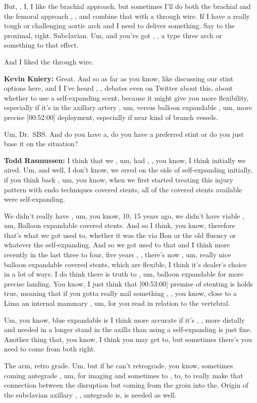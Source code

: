 \documentclass[
]{book}
\begin{document}
But, , I, I like the brachial approach, but sometimes I'll do both the
brachial and the femoral approach , , and combine that with a through
wire. If I have a really tough or challenging aortic arch and I need to
deliver something. Say to the proximal, right. Subclavian. Um, and
you've got , , a type three arch or something to that effect.

And I liked the through wire.

\textbf{Kevin Kniery:} Great. And so as far as you know, like discussing our
stint options here, and I I've heard , , debates even on Twitter about
this, about whether to use a self-expanding scent, because it might give
you more flexibility, especially if it's in the axillary artery , um,
versus balloon expandable , um, more precise {[}00:52:00{]} deployment,
especially if near kind of branch vessels.

Um, Dr.~SBS. And do you have a, do you have a preferred stint or do you
just base it on the situation?

\textbf{Todd Rasmussen:} I think that we , um, had , , you know, I think
initially we aired. Um, and well, I don't know, we erred on the side of
self-expanding initially, if you think back , um, you know, when we
first started treating this injury pattern with endo techniques covered
stents, all of the covered stents available were self-expanding.

We didn't really have , um, you know, 10, 15 years ago, we didn't have
viable , um, Balloon expandable covered stents. And so I think, you
know, therefore that's what we got used to, whether it was the via Bon
or the old fluency or whatever the self-expanding. And so we got used to
that and I think more recently in the last three to four, five years , ,
there's now , um, really nice balloon expandable covered stents, which
are flexible, I think it's dealer's choice in a lot of ways. I do think
there is truth to , um, balloon expandable for more precise landing. You
know, I just think that {[}00:53:00{]} premise of stenting is holds true,
meaning that if you gotta really nail something , , you know, close to a
Lima an internal mammary , um, for you read in relation to the
vertebral.

Um, you know, blue expandable is I think more accurate if it's , , more
distally and needed in a longer stand in the axilla than using a
self-expanding is just fine. Another thing that, you know, I think you
may get to, but sometimes there's you need to come from both right.

The arm, retro grade. Um, but if he can't retrograde, you know,
sometimes coming antegrade , um, for imaging and sometimes to , to, to
really make that connection between the disruption but coming from the
groin into the. Origin of the subclavian axillary , , antegrade is, is
needed as well.
\end{document}
